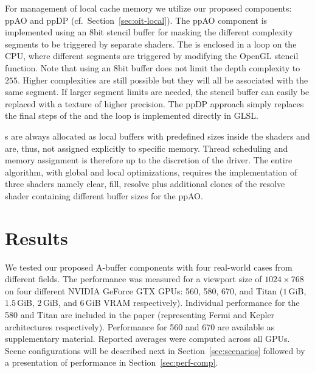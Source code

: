 \documentclass{egpubl}
\newcommand{\todo}[1]{{\color{red}\emph{(#1)}}}
\newcommand{\ab}{\mbox{A-buffer}}
\newcommand{\stencil}{ppAO}
\newcommand{\dloop}{ppDP}
\begin{document}
For management of local cache memory we utilize our proposed components: \stencil{} and \dloop{} (cf.~Section~\ref{sec:oit-local}). 
The \stencil{} component is implemented using an 8bit stencil buffer for masking the different complexity segments to be triggered by separate shaders.  
The \sFill{} is enclosed in a loop on the CPU, where different segments are triggered by modifying the OpenGL stencil function. 
Note that using an $8$bit buffer does not limit the depth complexity to $255$.
Higher complexities are still possible but they will all be associated with the same segment. 
If larger segment limits are needed, the stencil buffer can easily be replaced with a texture of higher precision. 
The \dloop{} approach simply replaces the final steps of the \sResolve{} and the loop is implemented directly in GLSL. 

\bArray{}s are always allocated as local buffers with predefined sizes inside the shaders and are, thus, not assigned explicitly to specific memory. 
Thread scheduling and memory assignment is therefore up to the discretion of the driver.
The entire algorithm, with global and local optimizations, requires the implementation of three shaders namely clear, fill, resolve plus additional clones of the resolve shader containing different buffer sizes for the \stencil{}.




\section{Results}
\label{sec:results}


We tested our proposed \ab{} components with four real-world cases from different fields.
The performance was measured for a viewport size of $1024 \times 768$ on four different NVIDIA GeForce GTX GPUs: 
560, 580, 670, and Titan ($1$\,GiB, $1.5$\,GiB, $2$\,GiB, and $6$\,GiB VRAM respectively).
%
Individual performance for the 580 and Titan are included in the paper (representing Fermi and Kepler architectures respectively). 
Performance for 560 and 670 are available as supplementary material. 
Reported averages were computed across all GPUs. 
Scene configurations will be described next in Section~\ref{sec:scenarios} followed by a presentation of performance in Section~\ref{sec:perf-comp}.
\end{document}
